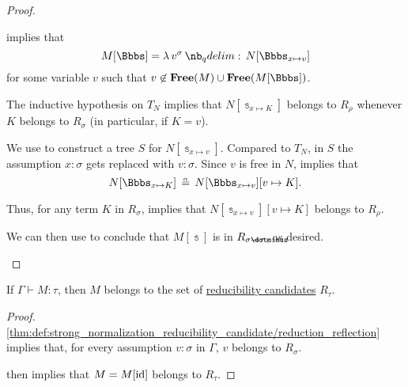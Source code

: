 \begin{proof}
\begin{itemize}
     implies that
    \begin{equation*}
      M[\Bbbs] = \qabs {v^\sigma} N[\Bbbs_{x \mapsto v}]
    \end{equation*}
    for some variable \( v \) such that \( v \not\in \op*{Free}(M) \cup \op*{Free}(M[\Bbbs]) \).

    The inductive hypothesis on \( T_N \) implies that \( N[\Bbbs_{x \mapsto K}] \) belongs to \( R_\rho \) whenever \( K \) belongs to \( R_\sigma \) (in particular, if \( K = v \)).

    We use  to construct a tree \( S \) for \( N[\Bbbs_{x \mapsto v}] \). Compared to \( T_N \), in \( S \) the assumption \( x: \sigma \) gets replaced with \( v: \sigma \). Since \( v \) is free in \( N \),  implies that
    \begin{equation*}
      N[\Bbbs_{x \mapsto K}] \aequiv N[\Bbbs_{x \mapsto v}][v \mapsto K].
    \end{equation*}

    Thus, for any term \( K \) in \( R_\sigma \),  implies that \( N[\Bbbs_{x \mapsto v}][v \mapsto K] \) belongs to \( R_\rho \).

    We can then use  to conclude that \( M[\Bbbs] \) is in \( R_{\sigma \synimplies \tau} \), as desired.
  \end{itemize}
\end{proof}

\begin{proposition}\label{thm:reducibility_candidate_adequacy}
  If \( \Gamma \vdash M: \tau \), then \( M \) belongs to the set of \hyperref[thm:def:strong_normalization_reducibility_candidate]{reducibility candidates} \( R_\tau \).
\end{proposition}
\begin{proof}
  \ref{thm:def:strong_normalization_reducibility_candidate/reduction_reflection} implies that, for every assumption \( v: \sigma \) in \( \Gamma \), \( v \) belongs to \( R_\sigma \).

   then implies that \( M = M[\operatorname{id}] \) belongs to \( R_\tau \).
\end{proof}

